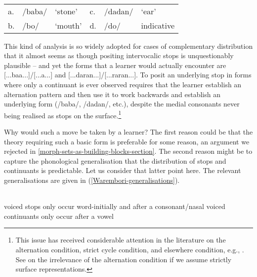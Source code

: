 \begin{example}  \label{Warembori-ur}\smallskip\\
\begin{tabular}{@{}llp{1.5in}lll@{}}
a. &/baba/ &`stone' 	&c. 	&/dadan/ &`ear'\\
b. &/bo/ &`mouth' 		&d.	&/do/ &{\sc indicative}\\
\end{tabular}
\end{example}


This kind of analysis is so widely adopted for cases of complementary distribution that it almost seems as though positing intervocalic stops is unquestionably plausible -- and yet the forms that a learner would actually encounter are [...baa...]/[...a...] and [...daran...]/[...raran...].  To posit an underlying stop in forms where only a continuant is ever observed requires that the learner establish an alternation pattern and then use it to work backwards and establish an underlying form (/baba/, /dadan/, etc.), despite the medial consonants never being realised as stops on the surface.\footnote{This  issue  has received considerable attention in the literature on the alternation condition,  strict cycle condition, and  elsewhere condition,  e.g., \citealt{Kiparsky:1968-opacity, Kiparsky:1973pr, Kiparsky:1982lexical-phonology, Mascaro:1976}. See \citet{vandeWeijer:2012} on the irrelevance of the alternation condition if we assume strictly surface representations.}

Why would such a move be taken by a learner? The first reason could be that the theory requiring such a basic form is preferable for some reason, an argument we rejected  in \textsection\ref{morph-sets-as-building-blocks-section}. The second reason might be to capture the phonological generalisation that the distribution of  stops and continuants is predictable. Let us consider that latter point here. The relevant generalisations are given in (\ref{Warembori-generalisations}).


\begin{example}\label{Warembori-generalisations}\\
\ea voiced stops only occur word-initially and after a consonant/nasal
\ex voiced continuants only occur after a vowel
\z
\end{example}

